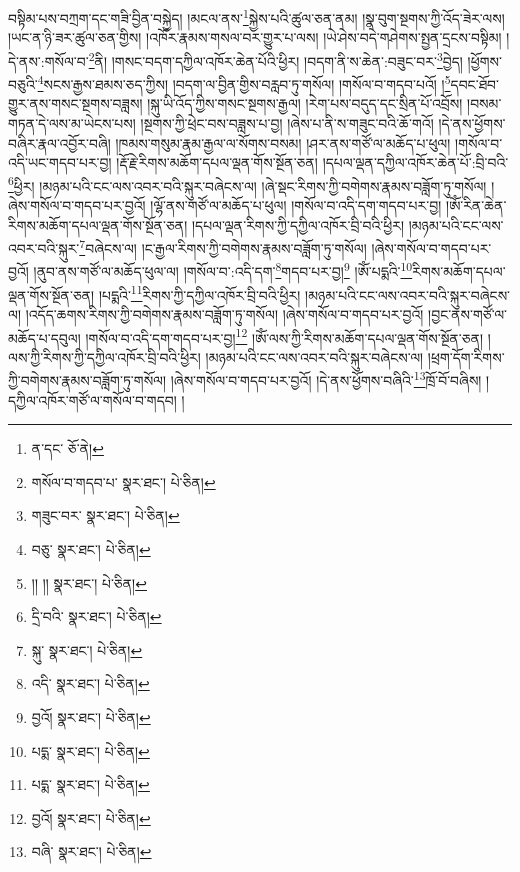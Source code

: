 བསྟིམ་པས་བཀྲག་དང་གཟི་བྱིན་བསྐྱེད། །མངལ་ནས་\footnote{ན་དང་  ཅོ་ནེ། }སྐྱེས་པའི་ཚུལ་ཅན་ནམ། །སྣ་བུག་སྔགས་ཀྱི་འོད་ཟེར་ལས། །ཡང་ན་ཉི་ཟར་ཚུལ་ཅན་གྱིས། །འཁོར་རྣམས་གསལ་བར་གྱུར་པ་ལས། །ཡེ་ཤེས་བདེ་གཤེགས་སྤྱན་དྲངས་བསྟིམ། །དེ་ནས་:གསོལ་བ་\footnote{གསོལ་བ་གདབ་པ་  སྣར་ཐང་།  པེ་ཅིན། }ནི། །གསང་བདག་དཀྱིལ་འཁོར་ཆེན་པོའི་ཕྱིར། །བདག་ནི་ས་ཆེན་:བཟུང་བར་\footnote{གཟུང་བར་  སྣར་ཐང་།  པེ་ཅིན། }བྱེད། །ཕྱོགས་བཅུའི་\footnote{བཅུ་  སྣར་ཐང་།  པེ་ཅིན། }སངས་རྒྱས་ཐམས་ཅད་ཀྱིས། །བདག་ལ་བྱིན་གྱིས་བརླབ་ཏུ་གསོལ། །གསོལ་བ་གདབ་པའོ། །\footnote{།། །།  སྣར་ཐང་།  པེ་ཅིན། }དབང་ཐོབ་གྱུར་ནས་གསང་སྔགས་བཟླས། །སྐུ་ཡི་འོད་ཀྱིས་གསང་སྔགས་རྒྱལ། །རེག་པས་བདུད་དང་སྲིན་པོ་འབྲོས། །བསམ་གཏན་དེ་ལས་མ་ཡེངས་པས། །སྔགས་ཀྱི་ཕྲེང་བས་བཟླས་པ་བྱ། །ཞེས་པ་ནི་ས་གཟུང་བའི་ཆོ་གའོ། །དེ་ནས་ཕྱོགས་བཞིར་རྣལ་འབྱོར་བཞི། །ཁམས་གསུམ་རྣམ་རྒྱལ་ལ་སོགས་བསམ། །ཤར་ནས་གཙོ་ལ་མཆོད་པ་ཕུལ། །གསོལ་བ་འདི་ཡང་གདབ་པར་བྱ། །རྡོ་རྗེ་རིགས་མཆོག་དཔལ་ལྡན་གོས་སྔོན་ཅན། །དཔལ་ལྡན་དཀྱིལ་འཁོར་ཆེན་པོ་:བྲི་བའི་\footnote{དྲི་བའི་  སྣར་ཐང་།  པེ་ཅིན། }ཕྱིར། །མཉམ་པའི་ངང་ལས་འབར་བའི་སྐུར་བཞེངས་ལ། །ཞེ་སྡང་རིགས་ཀྱི་བགེགས་རྣམས་བཟློག་ཏུ་གསོལ། །ཞེས་གསོལ་བ་གདབ་པར་བྱའོ། །ལྷོ་ནས་གཙོ་ལ་མཆོད་པ་ཕུལ། །གསོལ་བ་འདི་དག་གདབ་པར་བྱ། །ཨོཾ་རིན་ཆེན་རིགས་མཆོག་དཔལ་ལྡན་གོས་སྔོན་ཅན། །དཔལ་ལྡན་རིགས་ཀྱི་དཀྱིལ་འཁོར་བྲི་བའི་ཕྱིར། །མཉམ་པའི་ངང་ལས་འབར་བའི་སྐུར་\footnote{སྐུ་  སྣར་ཐང་།  པེ་ཅིན། }བཞེངས་ལ། །ང་རྒྱལ་རིགས་ཀྱི་བགེགས་རྣམས་བཟློག་ཏུ་གསོལ། །ཞེས་གསོལ་བ་གདབ་པར་བྱའོ། །ནུབ་ནས་གཙོ་ལ་མཆོད་ཕུལ་ལ། །གསོལ་བ་:འདི་དག་\footnote{འདི་  སྣར་ཐང་།  པེ་ཅིན། }གདབ་པར་བྱ།\footnote{བྱའོ།  སྣར་ཐང་།  པེ་ཅིན། } །ཨོཾ་པདྨའི་\footnote{པདྨ་  སྣར་ཐང་།  པེ་ཅིན། }རིགས་མཆོག་དཔལ་ལྡན་གོས་སྔོན་ཅན། །པདྨའི་\footnote{པདྨ་  སྣར་ཐང་།  པེ་ཅིན། }རིགས་ཀྱི་དཀྱིལ་འཁོར་བྲི་བའི་ཕྱིར། །མཉམ་པའི་ངང་ལས་འབར་བའི་སྐུར་བཞེངས་ལ། །འདོད་ཆགས་རིགས་ཀྱི་བགེགས་རྣམས་བཟློག་ཏུ་གསོལ། །ཞེས་གསོལ་བ་གདབ་པར་བྱའོ། །བྱང་ནས་གཙོ་ལ་མཆོད་པ་དབུལ། །གསོལ་བ་འདི་དག་གདབ་པར་བྱ།\footnote{བྱའོ།  སྣར་ཐང་།  པེ་ཅིན། } །ཨོཾ་ལས་ཀྱི་རིགས་མཆོག་དཔལ་ལྡན་གོས་སྔོན་ཅན། །ལས་ཀྱི་རིགས་ཀྱི་དཀྱིལ་འཁོར་བྲི་བའི་ཕྱིར། །མཉམ་པའི་ངང་ལས་འབར་བའི་སྐུར་བཞེངས་ལ། །ཕྲག་དོག་རིགས་ཀྱི་བགེགས་རྣམས་བཟློག་ཏུ་གསོལ། །ཞེས་གསོལ་བ་གདབ་པར་བྱའོ། །དེ་ནས་ཕྱོགས་བཞིའི་\footnote{བཞི་  སྣར་ཐང་།  པེ་ཅིན། }ཁྲོ་བོ་བཞིས། །དཀྱིལ་འཁོར་གཙོ་ལ་གསོལ་བ་གདབ། །

